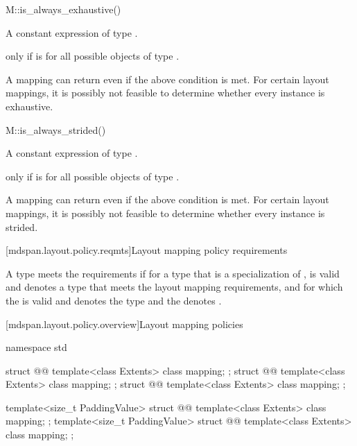 \begin{itemdecl}
M::is_always_exhaustive()
\end{itemdecl}

\begin{itemdescr}
\pnum
\result
A constant expression of type .

\pnum
\returns
{} only if  is 
for all possible objects  of type .
\begin{note}
A mapping can return  even if the above condition is met.
For certain layout mappings, it is possibly not feasible to determine
whether every instance is exhaustive.
\end{note}
\end{itemdescr}

\begin{itemdecl}
M::is_always_strided()
\end{itemdecl}

\begin{itemdescr}
\pnum
\result
A constant expression of type .

\pnum
\returns
{} only if  is 
for all possible objects  of type .
\begin{note}
A mapping can return  even if the above condition is met.
For certain layout mappings, it is possibly not feasible to determine
whether every instance is strided.
\end{note}
\end{itemdescr}

[mdspan.layout.policy.reqmts]{Layout mapping policy requirements}

\pnum
A type  meets the  requirements
if for a type  that is a specialization of ,
 is valid and denotes a type 
that meets the layout mapping requirements, and
for which the   is valid and
denotes the type  and
the   denotes .

[mdspan.layout.policy.overview]{Layout mapping policies}

\begin{codeblock}
namespace std {
  struct @@ {
    template<class Extents>
      class mapping;
  };
  struct @@ {
    template<class Extents>
      class mapping;
  };
  struct @@ {
    template<class Extents>
      class mapping;
  };

  template<size_t PaddingValue>
  struct @@ {
    template<class Extents> class mapping;
  };
  template<size_t PaddingValue>
  struct @@ {
    template<class Extents> class mapping;
  };
}
\end{codeblock}

